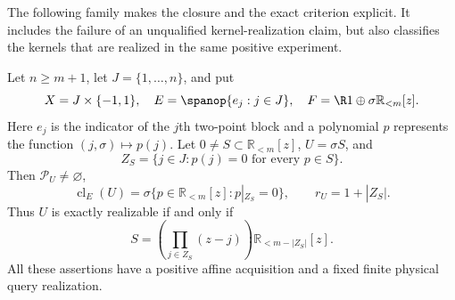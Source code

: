 The following family makes the closure and the exact criterion explicit.
It includes the failure of an unqualified kernel-realization claim, but
also classifies the kernels that are realized in the same positive
experiment.

\begin{proposition}
\label{prop:block-kernels}
Let $n\ge m+1$, let $J=\{1,\ldots,n\}$, and put
\[
 X=J\times\{-1,1\},\quad E=\spanop\{e_j:j\in J\},\quad
 F=\R1\oplus\sigma\mathbb R_{<m}[z].
\]
Here $e_j$ is the indicator of the $j$th two-point block and a polynomial
$p$ represents the function $(j,\sigma)\mapsto p(j)$. Let
$0\ne S\subset\mathbb R_{<m}[z]$, $U=\sigma S$, and
\[
 Z_S=\{j\in J:p(j)=0\text{ for every }p\in S\}.
\]
Then $\mathcal P_U\ne\varnothing$,
\begin{equation}\label{eq:block-kernel-classification}
 \operatorname{cl}_E(U)
   =\sigma\{p\in\mathbb R_{<m}[z]:p|_{Z_S}=0\},\qquad
 r_U=1+|Z_S|.
\end{equation}
Thus $U$ is exactly realizable if and only if
\begin{equation}\label{eq:block-root-condition}
 S=\left(\prod_{j\in Z_S}(z-j)\right)
                  \mathbb R_{<m-|Z_S|}[z].
\end{equation}
All these assertions have a positive affine acquisition and a fixed
finite physical query realization.
\end{proposition}
